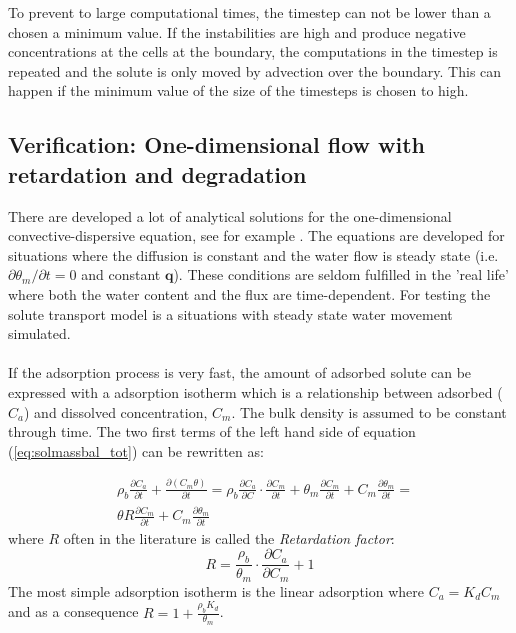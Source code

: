 \documentclass{report}
\begin{document}
To prevent to large computational times, the timestep can not be
lower than a chosen a minimum value. If the instabilities are high
and produce negative concentrations at the cells at the boundary,
the computations in the timestep is repeated and the solute is only
moved by advection over the boundary. This can happen if the
minimum value of the size of the timesteps is chosen to high.



\subsection{Verification: One-dimensional flow with retardation and degradation}

There are developed a lot of analytical solutions for the
one-dimensional convective-dispersive equation, see for example
\cite{Genuchtenanalytical}. The equations are developed for
situations where the diffusion is constant and the water flow is
steady state (i.e. $\partial \theta_{m} / \partial t=0$ and constant
$\mathbf{q}$). These conditions are seldom fulfilled in the 'real life'
where both the water content and the flux are time-dependent. For
testing the solute transport model is a situations with steady state
water movement simulated.\\
\\
If the adsorption process is very fast, the amount of adsorbed
solute can be expressed with a adsorption
isotherm which is a relationship
between adsorbed ($C_a$) and dissolved concentration, $C_m$.
The bulk density is assumed to be constant through time. The two
first terms of the left hand side of equation
(\ref{eq:solmassbal_tot}) can be rewritten as:

\begin{equation}
\begin{split}
&\rho_b\frac{\partial C_a}{\partial t}+\frac{\partial
  (C_{m}\theta)}{\partial t}=\rho_b\frac{\partial C_a}{\partial
  C}\cdot \frac{\partial C_{m}}{\partial t}
+\theta_{m} \frac{\partial C_{m}}{\partial t}+ C_{m}\frac{\partial
  \theta_{m}}{\partial t} = \\
&\theta R \frac{\partial C_{m}}{\partial t} + C_{m} \frac{\partial
  \theta_{m}}{\partial t}
\end{split}
\label{eq:retardation}
\end{equation}
%
where $R$ often in the literature is called the \textit{Retardation
  factor}:
%
\begin{equation}
R=\frac{\rho_b}{\theta_{m}} \cdot \frac{\partial C_a}{\partial
C_{m}}+1 \label{eq:retardationfactor}
\end{equation}
%
The most simple adsorption isotherm is the linear adsorption where
$C_a=K_dC_{m}$ and as a consequence
$R=1+\frac{\rho_bK_d}{\theta_{m}}$. \\
\\
\end{document}
